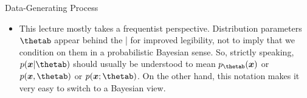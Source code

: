 \documentclass[11pt,compress,t,notes=noshow, xcolor=table]{beamer}
\begin{document}
\begin{vbframe}{Data-Generating Process}
\begin{itemize}
  \item This lecture mostly takes a frequentist perspective. Distribution 
  parameters $\thetab$ appear behind the | for improved legibility, not to imply 
  that we condition on them in a probabilistic Bayesian sense.
  So, strictly speaking, $p(\xv | \thetab)$ should usually be understood to mean 
  $p_{\thetab}(\xv)$ or $p(\xv, \thetab)$ or $p(\xv; \thetab)$.
  On the other hand, this notation makes it very easy to switch to a Bayesian view.

\end{itemize}

\end{vbframe}


\endlecture
\end{document}
